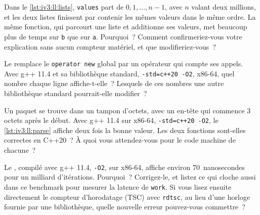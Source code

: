 \begin{question}\label{iq:iv3:low-latency:8}
Dans le \cref{lst:iv3:ll:lists}, \texttt{values} part de $0, 1, \dots, n-1$, avec $n$ valant deux millions, et les deux listes finissent par contenir les mêmes valeurs dans le même ordre. La même fonction, qui parcourt une liste et additionne ses valeurs, met beaucoup plus de temps sur \texttt{b} que sur \texttt{a}. Pourquoi~? Comment confirmeriez-vous votre explication sans aucun compteur matériel, et que modifieriez-vous~?
\label{lst:iv3:ll:lists}
\end{question}

\begin{question}\label{iq:iv3:low-latency:9}
Le  remplace le \texttt{operator new} global par un opérateur qui compte ses appels. Avec g++ 11.4 et sa bibliothèque standard, \texttt{-std=c++20 -O2}, x86-64, quel nombre chaque ligne affiche-t-elle~? Lesquels de ces nombres une autre bibliothèque standard pourrait-elle modifier~?
\label{lst:iv3:ll:countnew}
\end{question}

\begin{question}\label{iq:iv3:low-latency:10}
Un paquet se trouve dans un tampon d'octets, avec un en-tête qui commence 3 octets après le début. Avec g++ 11.4 sur x86-64, \texttt{-std=c++20 -O2}, le \cref{lst:iv3:ll:parse} affiche deux fois la bonne valeur. Les deux fonctions sont-elles correctes en C++20~? À quoi vous attendez-vous pour le code machine de chacune~?
\label{lst:iv3:ll:parse}
\end{question}

\begin{question}\label{iq:iv3:low-latency:11}
Le , compilé avec g++ 11.4, \texttt{-O2}, sur x86-64, affiche environ 70~nanosecondes pour un milliard d'itérations. Pourquoi~? Corrigez-le, et listez ce qui cloche aussi dans ce benchmark pour mesurer la latence de \texttt{work}. Si vous lisez ensuite directement le compteur d'horodatage (TSC) avec \texttt{rdtsc}, au lieu d'une horloge fournie par une bibliothèque, quelle nouvelle erreur pouvez-vous commettre~?
\label{lst:iv3:ll:benchbad}
\end{question}

